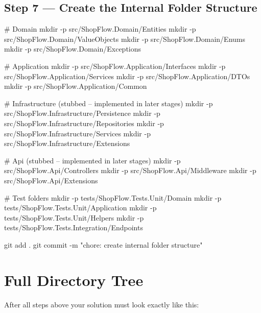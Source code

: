 \documentclass[11pt,a4paper]{article}
\begin{document}
\subsection{Step 7 --- Create the Internal Folder Structure}

\begin{codeframe}
\begin{codeblock}
# Domain
mkdir -p src/ShopFlow.Domain/Entities
mkdir -p src/ShopFlow.Domain/ValueObjects
mkdir -p src/ShopFlow.Domain/Enums
mkdir -p src/ShopFlow.Domain/Exceptions

# Application
mkdir -p src/ShopFlow.Application/Interfaces
mkdir -p src/ShopFlow.Application/Services
mkdir -p src/ShopFlow.Application/DTOs
mkdir -p src/ShopFlow.Application/Common

# Infrastructure (stubbed -- implemented in later stages)
mkdir -p src/ShopFlow.Infrastructure/Persistence
mkdir -p src/ShopFlow.Infrastructure/Repositories
mkdir -p src/ShopFlow.Infrastructure/Services
mkdir -p src/ShopFlow.Infrastructure/Extensions

# Api (stubbed -- implemented in later stages)
mkdir -p src/ShopFlow.Api/Controllers
mkdir -p src/ShopFlow.Api/Middleware
mkdir -p src/ShopFlow.Api/Extensions

# Test folders
mkdir -p tests/ShopFlow.Tests.Unit/Domain
mkdir -p tests/ShopFlow.Tests.Unit/Application
mkdir -p tests/ShopFlow.Tests.Unit/Helpers
mkdir -p tests/ShopFlow.Tests.Integration/Endpoints

git add .
git commit -m "chore: create internal folder structure"
\end{codeblock}
\end{codeframe}

\newpage
\section{Full Directory Tree}

After all steps above your solution must look exactly like this:
\end{document}
